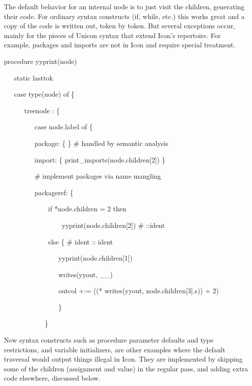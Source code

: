 The default behavior for an internal node is to just visit the
children, generating their code. For ordinary syntax constructs (if,
while, etc.) this works great and a copy of the code is written out,
token by token. But several exceptions occur, mainly for the pieces of
Unicon syntax that extend Icon's repertoire. For example, packages and
imports are not in Icon and require special treatment.

{\ttfamily\mdseries
procedure yyprint(node)}

{\ttfamily\mdseries
\ \ \ static lasttok}

{\ttfamily\mdseries
\ \ \ case type(node) of \{}

{\ttfamily\mdseries
\ \ \ \ \ \ {\textquotedbl}treenode{\textquotedbl} : \{}

{\ttfamily\mdseries
\ \ \ \ \ \ \ \ \ case node.label of \{}

{\ttfamily\mdseries
\ \ \ \ \ \ \ \ \ {\textquotedbl}package{\textquotedbl}: \{ \} \# handled by semantic analysis}

{\ttfamily\mdseries
\ \ \ \ \ \ \ \ \ {\textquotedbl}import{\textquotedbl}: \{ print\_imports(node.children[2]) \}}

{\ttfamily\mdseries
\ \ \ \ \ \ \ \ \ \# implement packages via name mangling}

{\ttfamily\mdseries
\ \ \ \ \ \ \ \ \ {\textquotedbl}packageref{\textquotedbl}: \{}

{\ttfamily\mdseries
\ \ \ \ \ \ \ \ \ \ \ \ \ if *node.children = 2 then}

{\ttfamily\mdseries
\ \ \ \ \ \ \ \ \ \ \ \ \ \ \ \ \ yyprint(node.children[2]) \# ::ident}

{\ttfamily\mdseries
\ \ \ \ \ \ \ \ \ \ \ \ \ else \{ \# ident :: ident}

{\ttfamily\mdseries
\ \ \ \ \ \ \ \ \ \ \ \ \ \ \ \ yyprint(node.children[1])}

{\ttfamily\mdseries
\ \ \ \ \ \ \ \ \ \ \ \ \ \ \ \ writes(yyout, {\textquotedbl}\_\_{\textquotedbl})}

{\ttfamily\mdseries
\ \ \ \ \ \ \ \ \ \ \ \ \ \ \ \ outcol +:= ((* writes(yyout, node.children[3].s)) + 2)}

{\ttfamily\mdseries
\ \ \ \ \ \ \ \ \ \ \ \ \ \ \ \ \}}

{\ttfamily\mdseries
\ \ \ \ \ \ \ \ \ \ \ \ \}}


New syntax constructs such as procedure parameter defaults and type
restrictions, and variable initializers, are other examples where the
default traversal would output things illegal in Icon. They are
implemented by skipping some of the children (assignment and value) in
the regular pass, and adding extra code elsewhere, discussed below.

